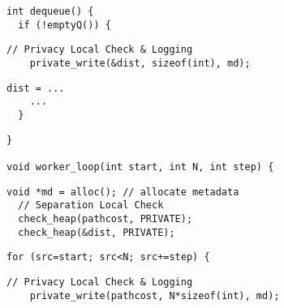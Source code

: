 
\begin{lstlisting}[morekeywords={pathcost}, belowskip=0pt, firstnumber=9, name=dij_checks]
int dequeue() {
  if (!emptyQ()) {
\end{lstlisting}

  \begin{lstlisting}[morekeywords={pathcost,dist}, aboveskip=0pt,belowskip=0pt,backgroundcolor=\color{lightgray},
  firstnumber=auto, name=dij_checks]
    // Privacy Local Check & Logging
    private_write(&dist, sizeof(int), md);
  \end{lstlisting}

  \begin{lstlisting}[morekeywords={pathcost,dist},aboveskip=0pt, belowskip=0pt, firstnumber=auto,name=dij_checks]
    dist = ...
    ...
  }
  \end{lstlisting}

  \begin{lstlisting}[morekeywords={pathcost,dist},aboveskip=0pt, belowskip=0pt,
firstnumber=18,name=dij_checks]
}

void worker_loop(int start, int N, int step) {
\end{lstlisting}

  \begin{lstlisting}[morekeywords={pathcost,dist}, aboveskip=0pt,belowskip=0pt,backgroundcolor=\color{lightgray},
  firstnumber=auto, name=dij_checks]
  void *md = alloc(); // allocate metadata
  // Separation Local Check
  check_heap(pathcost, PRIVATE);
  check_heap(&dist, PRIVATE);
  \end{lstlisting}

  \begin{lstlisting}[morekeywords={pathcost},aboveskip=0pt, belowskip=0pt, firstnumber=auto,name=dij_checks]
  for (src=start; src<N; src+=step) {
  \end{lstlisting}

  \begin{lstlisting}[morekeywords={pathcost}, aboveskip=0pt,belowskip=0pt,backgroundcolor=\color{lightgray},
  firstnumber=auto, name=dij_checks]
    // Privacy Local Check & Logging
    private_write(pathcost, N*sizeof(int), md);
  \end{lstlisting}

